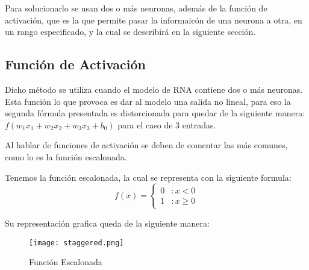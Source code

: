     Para solucionarlo se usan dos o más neuronas, además de la función de activación, que es la que permite pasar la informaicón de una neurona a otra, en un rango especificado, y la cual se describirá en la siguiente sección.

    \subsection{Función de Activación}

      Dicho método se utiliza cuando el modelo de RNA contiene dos o más neuronas.
      Esta función lo que provoca es dar al modelo una salida no lineal, para eso la segunda fórmula presentada es distorcionada para quedar de la siguiente manera: $f( w_1x_1 + w_2x_2 + w_3x_3 + b_0)$ para el caso de 3 entradas.
      
      Al hablar de funciones de activación se deben de comentar las más comunes, como lo es la función escalonada.

      Tenemos la función escalonada, la cual se representa con la siguiente formula: 
      \[f(x) = \left\{ \begin{array}{lr} 0 & : x < 0\\ 1 & : x \ge 0 \end{array} \right. \]

      Su representación grafica queda de la siguiente manera:
      \begin{figure}[H]
        \centering
        \texttt{[image: staggered.png]}
        \caption{Función Escalonada}
        \label{fig:Función Escalonada}
      \end{figure}

      